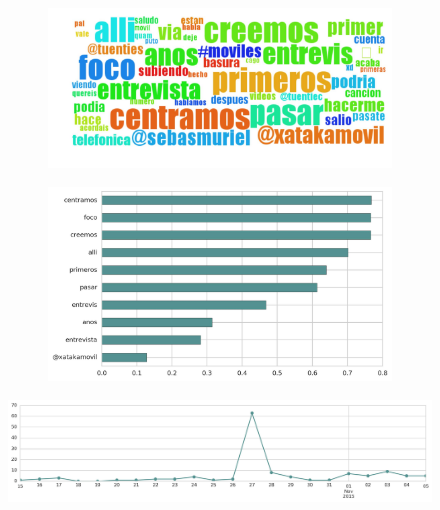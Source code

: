 \begin{figure}[htbp!]
    \centering
    \begin{subfigure}[b]{0.49\textwidth}
        \includegraphics[width=\textwidth]{twitter_all/report_images/topic-05-wordcloud.jpg}
    \end{subfigure}
    \begin{subfigure}[b]{0.49\textwidth}
        \includegraphics[width=\textwidth]{twitter_all/report_images/topic-05-terms.jpg}
    \end{subfigure}
\end{figure}

\begin{figure}[htbp!]
    \centering
    \includegraphics[width=\textwidth]{twitter_all/report_images/topic-05-timeseries.jpg}
\end{figure}

